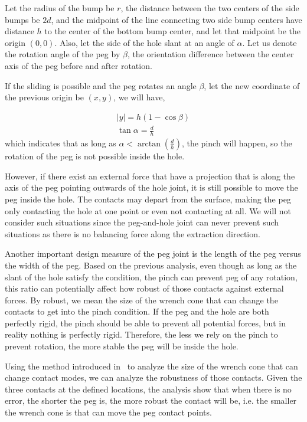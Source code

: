 \documentclass[11pt, twocolumn]{article}
\begin{document}
Let the radius of the bump be $r$, the distance between the two centers of the side bumps be $2d$, and the midpoint  of the line connecting two side bump centers have distance $h$ to the center of the bottom bump center, and let that midpoint be the origin $(0, 0)$. Also, let the side of the hole slant at an angle of $\alpha$. Let us denote the rotation angle of the peg by $\beta$, the orientation difference between the center axis of the peg before and after rotation. 

If the sliding is possible and the peg rotates an angle $\beta$, let the new coordinate of the previous origin be $(x, y)$, we will have, 

\begin{eqnarray}
|y| = h(1 - \cos\beta)\\
\tan\alpha = \frac{d}{h}
\end{eqnarray}
which indicates that as long as $\alpha < \arctan(\frac{d}{h})$, the pinch will happen, so the rotation of the peg is not possible inside the hole. 

However, if there exist an external force that have a projection that is along the axis of the peg pointing outwards of the hole joint, it is still possible to move the peg inside the hole. The contacts may depart from the surface, making the peg only contacting the hole at one point or even not contacting at all. We will not consider such situations since the peg-and-hole joint can never prevent such situations as there is no balancing force along the extraction direction. 

Another important design measure of the peg joint is the length of the peg versus the width of the peg. Based on the previous analysis, even though as long as the slant of the hole satisfy the condition, the pinch can prevent peg of any rotation, this ratio can potentially affect how robust of those contacts against external forces. By robust, we mean the size of the wrench cone that can change the contacts to get into the pinch condition. If the peg and the hole are both perfectly rigid, the pinch should be able to prevent all potential forces, but in reality nothing is perfectly rigid. Therefore, the less we rely on the pinch to prevent rotation, the more stable the peg will be inside the hole. 

Using the method introduced in~\cite{} to analyze the size of the wrench cone that can change contact modes, we can analyze the robustness of those contacts. Given the three contacts at the defined locations, the analysis show that when there is no error, the shorter the peg is, the more robust the contact will be, i.e. the smaller the wrench cone is that can move the peg contact points. 
\end{document}

